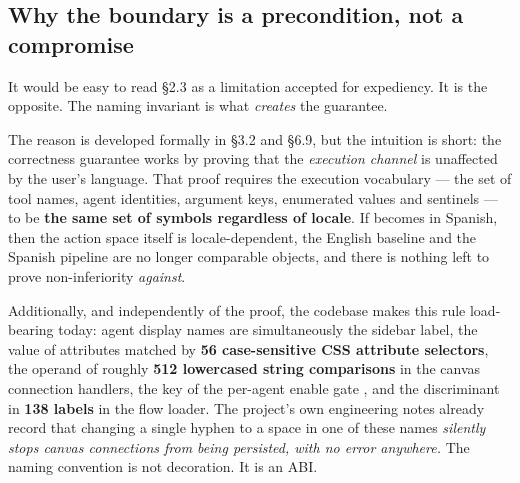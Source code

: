 \subsection{Why the boundary is a precondition, not a compromise}
\label{sec:boundary-precondition}

It would be easy to read \S2.3 as a limitation accepted for expediency. It is the opposite. The naming invariant is what \emph{creates} the guarantee.

The reason is developed formally in \S3.2 and \S6.9, but the intuition is short: the correctness guarantee works by proving that the \emph{execution channel} is unaffected by the user's language. That proof requires the execution vocabulary --- the set of tool names, agent identities, argument keys, enumerated values and sentinels --- to be \textbf{the same set of symbols regardless of locale}. If  becomes  in Spanish, then the action space itself is locale-dependent, the English baseline and the Spanish pipeline are no longer comparable objects, and there is nothing left to prove non-inferiority \emph{against}.

Additionally, and independently of the proof, the codebase makes this rule load-bearing today: agent display names are simultaneously the sidebar label, the value of  attributes matched by \textbf{56 case-sensitive CSS attribute selectors}, the operand of roughly \textbf{512 lowercased string comparisons} in the canvas connection handlers, the key of the per-agent enable gate , and the discriminant in \textbf{138  labels} in the flow loader. The project's own engineering notes already record that changing a single hyphen to a space in one of these names \emph{silently stops canvas connections from being persisted, with no error anywhere.} The naming convention is not decoration. It is an ABI.
